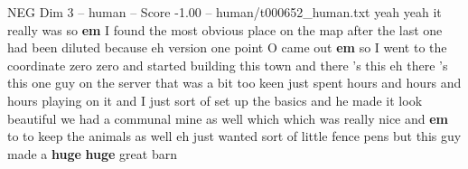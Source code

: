 \begin{textsample}{NEG Dim 3 – human – Score -1.00 – human/t000652\_human.txt}  \label{ex:f3_neg_032}
yeah yeah it really was so \textbf{em} I found the most obvious place on the map after the last one had been diluted because eh version one point O came out \textbf{em} so I went to the coordinate zero zero and started building this town and there 's this eh there 's this one guy on the server that was a bit too keen just spent hours and hours and hours playing on it and I just sort of set up the basics and he made it look beautiful we had a communal mine as well which which was really nice and \textbf{em} to to keep the animals as well eh just wanted sort of little fence pens but this guy made a \textbf{huge} \textbf{huge} great barn

\end{textsample}
